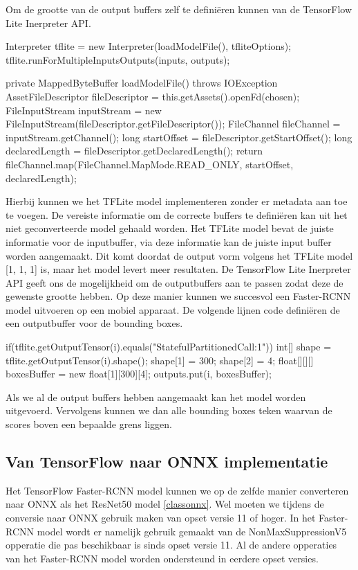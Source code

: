Om de grootte van de output buffers zelf te defini\"eren kunnen van de TensorFlow Lite Inerpreter API.

\begin{python}
Interpreter tflite = new Interpreter(loadModelFile(), tfliteOptions);
tflite.runForMultipleInputsOutputs(inputs, outputs);

private MappedByteBuffer loadModelFile() throws IOException {
    AssetFileDescriptor fileDescriptor = this.getAssets().openFd(chosen);
    FileInputStream inputStream = new FileInputStream(fileDescriptor.getFileDescriptor());
    FileChannel fileChannel = inputStream.getChannel();
    long startOffset = fileDescriptor.getStartOffset();
    long declaredLength = fileDescriptor.getDeclaredLength();
    return fileChannel.map(FileChannel.MapMode.READ_ONLY, startOffset, declaredLength);
}
\end{python}

Hierbij kunnen we het TFLite model implementeren zonder er metadata aan toe te voegen.
De vereiste informatie om de correcte buffers te defini\"eren kan uit het niet geconverteerde model gehaald worden.
Het TFLite model bevat de juiste informatie voor de inputbuffer, via deze informatie kan de juiste input buffer worden aangemaakt.
Dit komt doordat de output vorm volgens het TFLite model [1, 1, 1] is, maar het model levert meer resultaten.
De TensorFlow Lite Inerpreter API geeft ons de mogelijkheid om de outputbuffers aan te passen zodat deze de gewenste grootte hebben.
Op deze manier kunnen we succesvol een Faster-RCNN model uitvoeren op een mobiel apparaat.
De volgende lijnen code defini\"eren de een outputbuffer voor de bounding boxes.

\begin{python}
if(tflite.getOutputTensor(i).equals("StatefulPartitionedCall:1")) {
    int[] shape = tflite.getOutputTensor(i).shape();
    shape[1] = 300;
    shape[2] = 4;
    float[][][] boxesBuffer = new float[1][300][4];
    outputs.put(i, boxesBuffer);
}
\end{python}

Als we al de output buffers hebben aangemaakt kan het model worden uitgevoerd.
Vervolgens kunnen we dan alle bounding boxes teken waarvan de scores boven een bepaalde grens liggen.

\subsection{Van TensorFlow naar ONNX implementatie}
Het TensorFlow Faster-RCNN model kunnen we op de zelfde manier converteren naar ONNX als het ResNet50 model \ref{classonnx}.
Wel moeten we tijdens de conversie naar ONNX gebruik maken van opset versie 11 of hoger.
In het Faster-RCNN model wordt er namelijk gebruik gemaakt van de NonMaxSuppressionV5 opperatie die pas beschikbaar is sinds opset versie 11.
Al de andere opperaties van het Faster-RCNN model worden ondersteund in eerdere opset versies.

